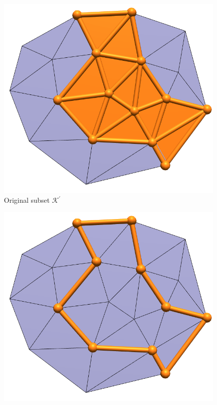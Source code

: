 \documentclass{article}
\begin{document}
\pagebreak
{}\\\\


\begin{table}[ht]
    \begin{subfigure}{0.45\columnwidth}
    \includegraphics[width=\linewidth]{figs/2_9_orig.png}
    \caption{Original subset $\mathcal{K}^\prime$}
    \end{subfigure}
    \begin{subfigure}{0.45\columnwidth}
    \includegraphics[width=\linewidth]{figs/2_9_bd.png}   

\end{subfigure}
\end{table}
\end{document}
